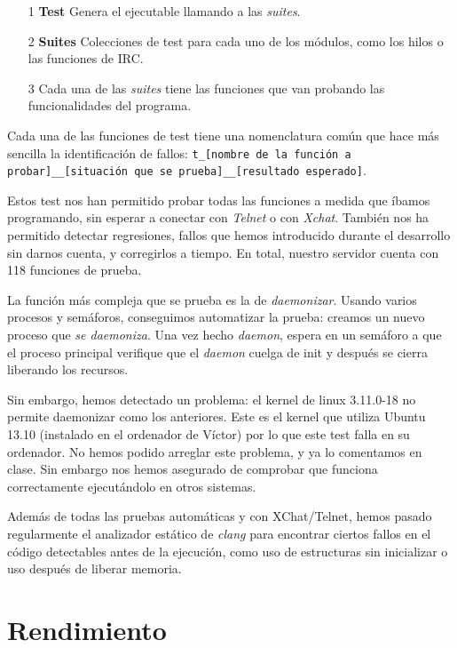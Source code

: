 \documentclass{article}
\begin{document}
\begin{itemize}
\item[1] \textbf{Test} Genera el ejecutable llamando a las \textit{suites}.
\item[2] \textbf{Suites} Colecciones de test para cada uno de los módulos, como los hilos o las funciones de IRC.
\item[3] Cada una de las \textit{suites} tiene las funciones que van probando las funcionalidades del programa.
\end{itemize}

Cada una de las funciones de test tiene una nomenclatura común que hace más sencilla la identificación de fallos: \texttt{t\_[nombre de la función a probar]\_\_[situación que se prueba]\_\_[resultado esperado]}.

Estos test nos han permitido probar todas las funciones a medida que íbamos programando, sin esperar a conectar con \textit{Telnet} o con \textit{Xchat}. También nos ha permitido detectar regresiones, fallos que hemos introducido durante el desarrollo sin darnos cuenta, y corregirlos a tiempo. En total, nuestro servidor cuenta con 118 funciones de prueba.

La función más compleja que se prueba es la de \textit{daemonizar}. Usando varios procesos y semáforos, conseguimos automatizar la prueba: creamos un nuevo proceso que \textit{se daemoniza}. Una vez hecho \textit{daemon}, espera en un semáforo a que el proceso principal verifique que el \textit{daemon} cuelga de init y después se cierra liberando los recursos.

Sin embargo, hemos detectado un problema: el kernel de linux 3.11.0-18 no permite daemonizar como los anteriores. Este es el kernel que utiliza Ubuntu 13.10 (instalado en el ordenador de Víctor) por lo que este test falla en su ordenador. No hemos podido arreglar este problema, y ya lo comentamos en clase. Sin embargo nos hemos asegurado de comprobar que funciona correctamente ejecutándolo en otros sistemas.

Además de todas las pruebas automáticas y con XChat/Telnet, hemos pasado regularmente el analizador estático de \textit{clang} para encontrar ciertos fallos en el código detectables antes de la ejecución, como uso de estructuras sin inicializar o uso después de liberar memoria.

\section{Rendimiento}
\end{document}
